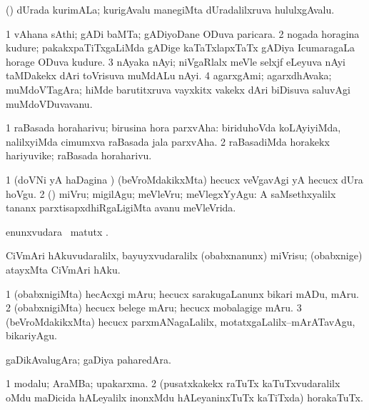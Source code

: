 \bentry
{}
\gl{\nA}
\bmng
(\AseTxrXV) dUrada kurimALa; kurigAvalu manegiMta dUradalilxruva hululxgAvalu. 
\emng
\eentry

\bentry
{}
\gl{\nA}
\bmng
\bnum
\num{1} vAhana sAthi; gADi baMTa; gADiyoDane ODuva paricara. 
\num{2} nogada horagina kudure; pakakxpaTiTxgaLiMda gADige kaTaTxlapxTaTx gADiya IcumaragaLa horage ODuva kudure. 
\num{3} nAyaka nAyi; niVgaRlalx meVle selxjf eLeyuva nAyi taMDakekx dAri toVrisuva muMdALu nAyi. 
\num{4} agarxgAmi; agarxdhAvaka; muMdoVTagAra; hiMde barutitxruva vayxkitx \mo vakekx dAri biDisuva saluvAgi muMdoVDuvavanu. 
\enum
\emng
\eentry

\bentry
{}
\gl{\nA}
\bmng
\bnum
\num{1} raBasada horaharivu; birusina hora parxvAha:  biriduhoVda koLAyiyiMda, nalilxyiMda cimumxva raBasada jala parxvAha. 
\num{2} raBasadiMda horakekx hariyuvike; raBasada horaharivu. 
\enum
\emng
\eentry


\bentry
{}
\gl{\sakirx}
\bmng
\bnum
\num{1} (doVNi yA haDagina \vi) (beVroMdakikxMta) hecucx veVgavAgi yA hecucx dUra hoVgu. 
\num{2} (\rUpa) miVru; migilAgu; meVleVru; meVlegxYyAgu:  A saMsethxyalilx tananx parxtisapxdhiRgaLigiMta avanu meVleVrida. 
\enum
\emng
\eentry

\bentry
{}
\gl{\kirx}
\bmng
{} enunxvudara \BU\ matutx \BUkaq. 
\emng
\eentry

\bentry
{}
\gl{\sakirx}
\bmng
CiVmAri hAkuvudaralilx, bayuyxvudaralilx (obabxnanunx) miVrisu; (obabxnige) atayxMta CiVmAri hAku. 
\emng
\eentry

\bentry
{}
\gl{\sakirx}
\bmng
\bnum
\num{1} (obabxnigiMta) hecAcxgi mAru; hecucx sarakugaLanunx bikari mADu, mAru. 
\num{2} (obabxnigiMta) hecucx belege mAru; hecucx mobalagige mAru. 
\num{3} (beVroMdakikxMta) hecucx parxmANagaLalilx, motatxgaLalilx--mArATavAgu, bikariyAgu. 
\enum
\emng
\eentry

\bentry
{}
\gl{\nA}
\bmng
gaDikAvalugAra; gaDiya paharedAra. 
\emng
\eentry

\bentry
{}
\gl{\nA}
\bmng
\bnum
\num{1} modalu; AraMBa; upakarxma. 
\num{2} (pusatxkakekx raTuTx kaTuTxvudaralilx oMdu maDicida hALeyalilx inonxMdu hALeyaninxTuTx kaTiTxda) horakaTuTx. 
\enum
\emng

